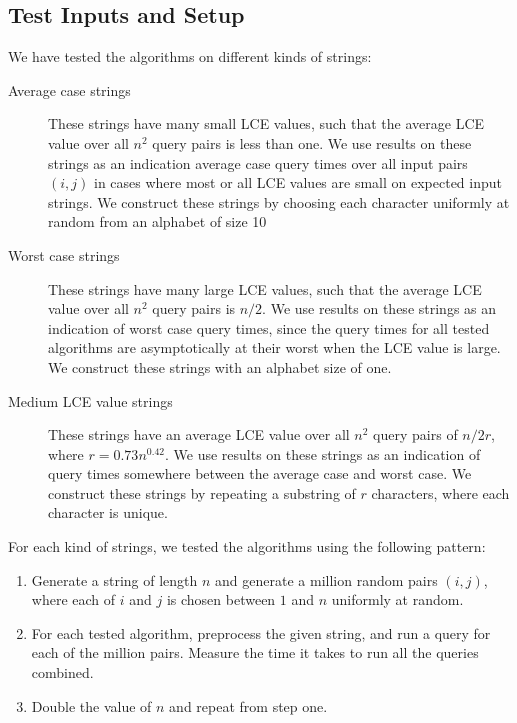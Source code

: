 \documentclass[a4]{article}
\begin{document}
\fi %

\subsection{Test Inputs and Setup}

We have tested the algorithms on different kinds of strings:
\begin{description}
\item[Average case strings] These strings have many small LCE values, such that the average LCE value over all $n^2$ query pairs is less than one. We use results on these strings as an indication average case query times over all input pairs $(i,j)$ in cases where most or all LCE values are small on expected input strings. We construct these strings by choosing each character uniformly at random from an alphabet of size 10
\item[Worst case strings] These strings have many large LCE values, such that the average LCE value over all $n^2$ query pairs is $n/2$. We use results on these strings as an indication of worst case query times, since the query times for all tested algorithms are asymptotically at their worst when the LCE value is large. We construct these strings with an alphabet size of one.
\item[Medium LCE value strings] These strings have an average LCE value over all $n^2$ query pairs of $n/2r$, where $r=0.73n^{0.42}$. We use results on these strings as an indication of query times somewhere between the average case and worst case. We construct these strings by repeating a substring of $r$ characters, where each character is unique.
\end{description}

For each kind of strings, we tested the algorithms using the following pattern:
\begin{enumerate}
\item Generate a string of length $n$ and generate a million random pairs $(i, j)$, where each of $i$ and $j$ is chosen between $1$ and $n$ uniformly at random.
\item For each tested algorithm, preprocess the given string, and run a query for each of the million pairs. Measure the time it takes to run all the queries combined.
\item Double the value of $n$ and repeat from step one.
\end{enumerate}
\end{document}
